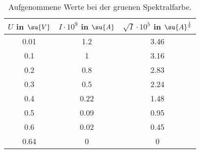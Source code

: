 \begin{table}
  \centering
  \label{tab:Gruen}
  \caption{Aufgenommene Werte bei der gruenen Spektralfarbe.}
  \begin{tabular}{c c c}
    \toprule
    $U$ in $\su{V}$ & $I\cdot 10^{9}$ in $\su{A}$ & $\sqrt{I}\cdot10^{5}$ in $\su{A}^{\frac{1}{2}}$ \\
    \midrule
    0.01 & 1.2  & 3.46 \\
    0.1  & 1    & 3.16 \\
    0.2  & 0.8  & 2.83 \\
    0.3  & 0.5  & 2.24 \\
    0.4  & 0.22 & 1.48 \\
    0.5  & 0.09 & 0.95 \\
    0.6  & 0.02 & 0.45 \\
    0.64 & 0    & 0    \\
    \bottomrule
  \end{tabular}
\end{table}
